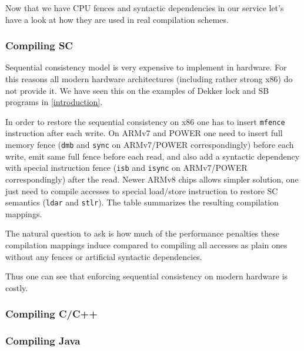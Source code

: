 \documentclass[a4paper,twoside,11pt]{article}
\numberwithin{equation}{section}
\begin{document}
Now that we have CPU fences and syntactic dependencies in our service
let's have a look at how they are used in real compilation schemes.

\subsubsection{Compiling SC}

Sequential consistency model is very expensive to implement in hardware. 
For this reasons all modern hardware architectures (including rather strong x86) do not provide it. 
We have seen this on the examples of Dekker lock and SB programs in \ref{introduction}.

In order to restore the sequential consistency on x86 one has to 
insert \texttt{mfence} instruction after each write.
On ARMv7 and POWER one need to insert full memory fence
(\texttt{dmb} and \texttt{sync} on ARMv7/POWER correspondingly)
before each write,
emit same full fence before each read, and also
add a syntactic dependency with special instruction fence 
(\texttt{isb} and \texttt{isync} on ARMv7/POWER correspondingly)
after the read.
Newer ARMv8 chips allows simpler solution, 
one just need to compile accesses to special 
load/store instruction to restore SC semantics
(\texttt{ldar} and \texttt{stlr}).
The table summarizes the resulting compilation mappings.


The natural question to ask is how much of the performance penalties
these compilation mappings induce compared to compiling all accesses as plain ones
without any fences or artificial syntactic dependencies.


Thus one can see that enforcing sequential consistency on modern hardware is costly.

\subsubsection{Compiling C/C++}

\subsubsection{Compiling Java}
\end{document}

